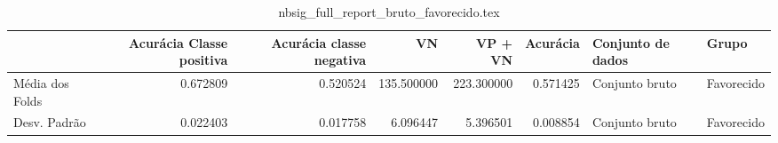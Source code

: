 \begin{table}
\centering
\caption{nbsig_full_report_bruto_favorecido.tex}
\label{nbsig_full_report_bruto_favorecido.tex}
\begin{tabular}{lrrrrrll}
\toprule
{} &  Acurácia Classe positiva &  Acurácia classe negativa &         VN  &    VP + VN  &  Acurácia & Conjunto de dados &       Grupo \\
\midrule
Média dos Folds &                  0.672809 &                  0.520524 &  135.500000 &  223.300000 &  0.571425 &    Conjunto bruto &  Favorecido \\
Desv. Padrão    &                  0.022403 &                  0.017758 &    6.096447 &    5.396501 &  0.008854 &    Conjunto bruto &  Favorecido \\
\bottomrule
\end{tabular}
\end{table}
